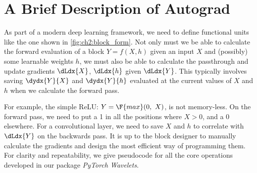 \section{A Brief Description of Autograd}
As part of a modern deep learning framework, we need to define functional units like
the one shown in \autoref{fig:ch2:block_form}. Not only must we be able to
calculate the forward evaluation of a block $Y=f(X,h)$ given an input $X$ and
(possibly) some learnable weights $h$, we must also be able to calculate the
passthrough and update gradients $\dLdx{X}$, $\dLdx{h}$ given $\dLdx{Y}$. This
typically involves saving $\dydx{Y}{X}$ and $\dydx{Y}{h}$ evaluated at the
current values of $X$ and $h$ when we calculate the forward pass.

For example, the simple ReLU: $Y = \F{max}(0,\ X)$, is not memory-less. On the
forward pass, we need to put a 1 in all the positions where $X > 0$, and a 0
elsewhere. For a convolutional layer, we need to save $X$ and $h$ to
correlate with $\dLdx{Y}$ on the backwards pass. It is up to the block designer
to manually calculate the gradients and design the most efficient way of
programming them.  
For clarity and repeatability, we give pseudocode for all the core operations
developed in our package \emph{PyTorch Wavelets}. 



